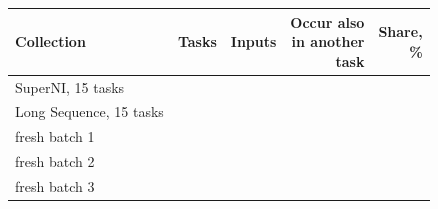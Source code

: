 {\footnotesize\setlength{\tabcolsep}{3pt}\begin{tabular}{lrrrr}
    \toprule
    Collection & Tasks & Inputs & \shortstack[r]{Occur also\\in another\\task} & \shortstack[r]{Share,\\\%} \\
    \midrule
    SuperNI, 15 tasks & \AudConfOneTasks{} & \AudConfOneInputs{} & \AudConfOneShared{} & \AudConfOneShare{} \\
    Long Sequence, 15 tasks & \AudConfTwoTasks{} & \AudConfTwoInputs{} & \AudConfTwoShared{} & \AudConfTwoShare{} \\
    fresh batch 1 & \AudConfThreeTasks{} & \AudConfThreeInputs{} & \AudConfThreeShared{} & \AudConfThreeShare{} \\
    fresh batch 2 & \AudConfFourTasks{} & \AudConfFourInputs{} & \AudConfFourShared{} & \AudConfFourShare{} \\
    fresh batch 3 & \AudConfFiveTasks{} & \AudConfFiveInputs{} & \AudConfFiveShared{} & \AudConfFiveShare{} \\
    \bottomrule
\end{tabular}}
